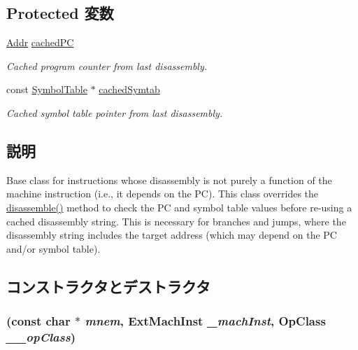 \subsection*{Protected 変数}
\begin{DoxyCompactItemize}
\item 
\hyperlink{base_2types_8hh_af1bb03d6a4ee096394a6749f0a169232}{Addr} \hyperlink{classPowerISA_1_1PCDependentDisassembly_a92e75fec0c774a50b26a771e76837a1d}{cachedPC}
\begin{DoxyCompactList}\small\item\em Cached program counter from last disassembly. \item\end{DoxyCompactList}\item 
const \hyperlink{classSymbolTable}{SymbolTable} $\ast$ \hyperlink{classPowerISA_1_1PCDependentDisassembly_a1caab72ff070063c1be05a93a7014546}{cachedSymtab}
\begin{DoxyCompactList}\small\item\em Cached symbol table pointer from last disassembly. \item\end{DoxyCompactList}\end{DoxyCompactItemize}


\subsection{説明}
Base class for instructions whose disassembly is not purely a function of the machine instruction (i.e., it depends on the PC). This class overrides the \hyperlink{classPowerISA_1_1PCDependentDisassembly_a8b5fcb5ee981f062dfbdd09d676922f6}{disassemble()} method to check the PC and symbol table values before re-\/using a cached disassembly string. This is necessary for branches and jumps, where the disassembly string includes the target address (which may depend on the PC and/or symbol table). 

\subsection{コンストラクタとデストラクタ}
\hypertarget{classPowerISA_1_1PCDependentDisassembly_a14ed7b5973f7faa16a2692e177b7b8e3}{
\subsubsection[{PCDependentDisassembly}]{ (const char $\ast$ {\em mnem}, \/  {\bf ExtMachInst} {\em \_\-machInst}, \/  OpClass {\em \_\-\_\-opClass})}}
\label{classPowerISA_1_1PCDependentDisassembly_a14ed7b5973f7faa16a2692e177b7b8e3}


